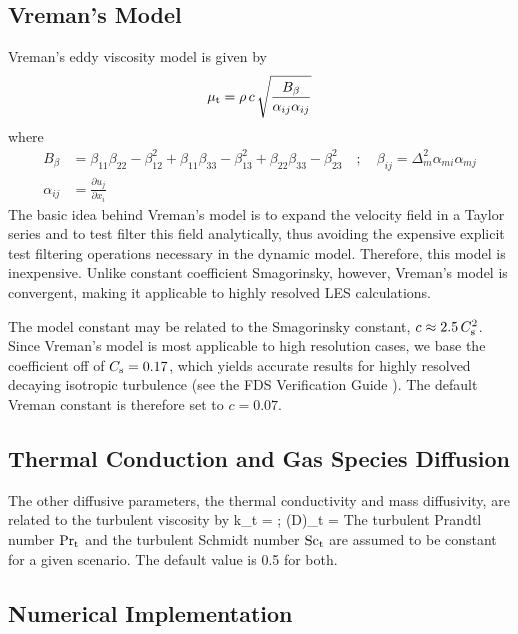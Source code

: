 \subsection{Vreman's Model}
\label{sec:vreman}

Vreman's eddy viscosity model \cite{vreman:2004} is given by
\begin{equation}
\label{eqn_mu_vreman}
\mu_{\rm t} = \rho \, c \, \sqrt{ \frac{B_\beta}{\alpha_{ij}\alpha_{ij}} }
\end{equation}
where
\begin{align}
B_\beta     &= \beta_{11}\beta_{22} - \beta_{12}^2 + \beta_{11}\beta_{33} - \beta_{13}^2 + \beta_{22}\beta_{33} - \beta_{23}^2 \quad ; \quad \beta_{ij} = \Delta_m^2 \alpha_{mi} \alpha_{mj} \\
\alpha_{ij} &= \frac{\partial u_j}{\partial x_i}
\end{align}
The basic idea behind Vreman's model is to expand the velocity field in a Taylor series and to test filter this field analytically, thus avoiding the expensive explicit test filtering operations necessary in the dynamic model.  Therefore, this model is inexpensive.  Unlike constant coefficient Smagorinsky, however, Vreman's model is convergent, making it applicable to highly resolved LES calculations.

The model constant may be related to the Smagorinsky constant, $c \approx 2.5 \, C_{\rm s}^2$.  Since Vreman's model is most applicable to high resolution cases, we base the coefficient off of $C_{\rm s} = 0.17$, which yields accurate results for highly resolved decaying isotropic turbulence (see the FDS Verification Guide \cite{FDS_Verification_Guide}).  The default Vreman constant is therefore set to $c = 0.07$.

\subsection{Thermal Conduction and Gas Species Diffusion}

The other diffusive parameters,
the thermal conductivity and mass diffusivity, are related to the turbulent viscosity by
\be k_{\rm t} = 
\quad ; \quad
 (\rho D)_{\rm t} = \ee
The turbulent Prandtl number $\hbox{Pr}_{\rm t}$ and the turbulent Schmidt number $\hbox{Sc}_{\rm t}$ are assumed to be constant for a given scenario.  The default value is 0.5 for both.

\subsection{Numerical Implementation}

